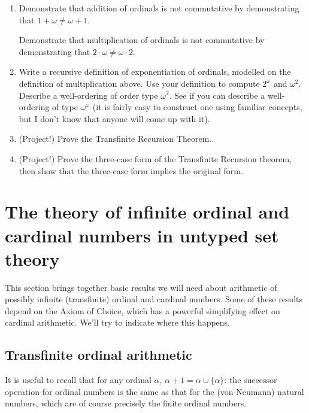 \documentclass[12pt]{book}
\begin{document}
\begin{enumerate}

\item  Demonstrate that addition of ordinals is not commutative by demonstrating that $1+\omega \neq \omega+1$.

Demonstrate that multiplication of ordinals is not commutative by demonstrating that $2 \cdot \omega \neq \omega \cdot 2$.

\item  Write a recursive definition of exponentiation of ordinals, modelled on the definition of multiplication above.  Use your definition to compute $2^{\omega}$ and $\omega^2$.   Describe a well-ordering of order type
$\omega^2$.  See if you can describe a well-ordering of type $\omega^{\omega}$ (it is fairly easy to construct one using familiar concepts, but I don't know that anyone will come up with it).

\item (Project!)  Prove the Transfinite Recursion Theorem.

\item (Project!)  Prove the three-case form of the Transfinite Recursion theorem, then show that the three-case form implies the original form.


\end{enumerate}

\newpage

\section{The theory of infinite ordinal and cardinal numbers in untyped set theory}

This section brings together basic results we will need about arithmetic of possibly infinite (transfinite) ordinal and cardinal numbers.  Some of these results depend on the Axiom of Choice, which has a powerful simplifying effect on cardinal arithmetic.  We'll try to indicate where this happens.

\subsection{Transfinite ordinal arithmetic}

It is useful to recall that for any ordinal $\alpha$, $\alpha+1 = \alpha \cup \{\alpha\}$:  the successor operation for ordinal numbers is the same as that for the (von Neumann) natural numbers, which are of course precisely the finite ordinal numbers.
\end{document}
